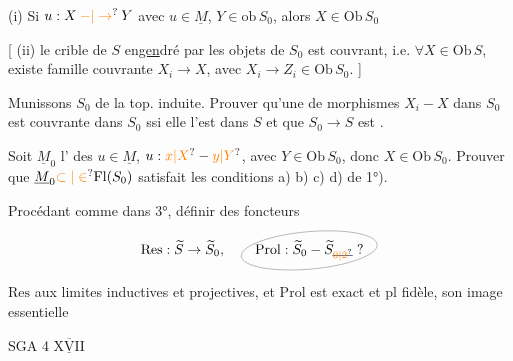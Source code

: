 (i) Si $u:X\mathbin{\unsure{-|\to}}Y$ avec $u\in\underline{M}$, $Y\in\mathrm{ob}\,S_0$, alors $X\in\mathrm{Ob}\,S_0$

[ (ii)  le crible de $S$ en\uline{gen}dré par les objets de $S_0$ est couvrant, i.e. $\forall X\in\mathrm{Ob}\,S$, existe famille couvrante $X_i\to X$, avec $X_i\to Z_i\in\mathrm{Ob}\,S_0$. ]

 Munissons $S_0$ de la top. induite. Prouver qu'une  de morphismes $X_i-X$ dans $S_0$ est couvrante dans $S_0$ ssi elle l'est dans $S$\unsure{,} et que $S_0\to S$ est \uline{}.

Soit $\underline{M}_0$ l' des $u\in\underline{M}$,  $u:\unsure{x|X}-\unsure{y|Y}$, avec $Y\in\mathrm{Ob}\,S_0$, donc $X\in\mathrm{Ob}\,S_0$. Prouver que $\underline{M}_0\unsure{\subset|\in}\mathrm{Fl}(S_0)$ satisfait les conditions a) b) c) d) de 1°).

Procédant comme dans 3°, définir des foncteurs
\[
\mathrm{Res}:\widetilde{S}\to\widetilde{S}_0,\quad
\tikz[baseline=(p.base)]{\node[inner sep=1pt] (p) {$\mathrm{Prol}:\widetilde{S}_0\mathbin{-}\widetilde{S}_{\deleted{\unsure{0|2}}}\;?$}; \draw[gray,thin,rotate around={5:(p.center)}] (p.center) ellipse (4.9em and 1.35em);}
\]
 $\mathrm{Res}$  aux limites inductives et projectives, et $\mathrm{Prol}$ est exact   et pl fidèle, son image essentielle

SGA 4 $\underline{\overline{\mathrm{XVII}}}$


